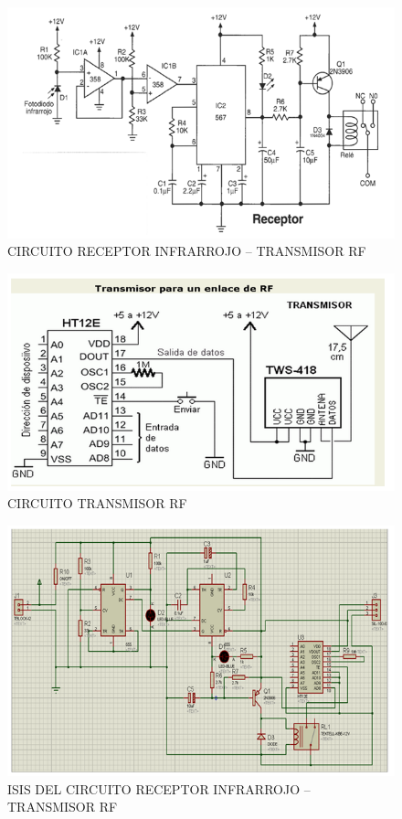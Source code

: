 \documentclass[a4paper,11pt]{article}
\begin{document}
	\begin{figure}[h]
		\caption{CIRCUITO RECEPTOR INFRARROJO – TRANSMISOR RF}
		\centering
		\includegraphics[width=0.7\linewidth]{./12}
	\end{figure}
	
	\begin{figure}[h]
		\caption{CIRCUITO TRANSMISOR RF}
		\centering
		\includegraphics[width=0.7\linewidth]{./13}
	\end{figure}	
	
	\begin{figure}[h]
		\caption{ISIS DEL CIRCUITO RECEPTOR INFRARROJO – TRANSMISOR RF}
		\centering
		\includegraphics[width=0.9\linewidth]{./14}
	\end{figure}
\end{document}
